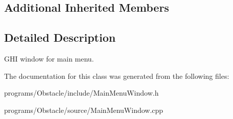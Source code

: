 \subsection*{Additional Inherited Members}


\subsection{Detailed Description}
G\+HI window for main menu. 

The documentation for this class was generated from the following files\+:\begin{DoxyCompactItemize}
\item 
programs/\+Obstacle/include/Main\+Menu\+Window.\+h\item 
programs/\+Obstacle/source/Main\+Menu\+Window.\+cpp\end{DoxyCompactItemize}

